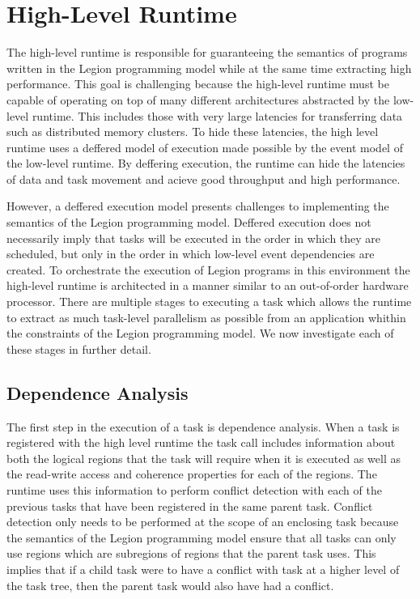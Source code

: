 
\section{High-Level Runtime} 
\label{sec:highlevel}
The high-level runtime is responsible for guaranteeing the semantics 
of programs written in the Legion programming model while at the same
time extracting high performance.  This goal is challenging because
the high-level runtime must be capable of operating on top of many 
different architectures abstracted by the low-level runtime.  This 
includes those with very large latencies for transferring data such
as distributed memory clusters.  To hide these latencies, the high
level runtime uses a deffered model of execution made possible by the
event model of the low-level runtime.  By deffering execution, the 
runtime can hide the latencies of data and task movement and acieve
good throughput and high performance.

However, a deffered execution model presents challenges to implementing
the semantics of the Legion programming model.  Deffered execution
does not necessarily imply that tasks will be executed in the order in
which they are scheduled, but only in the order in which low-level
event dependencies are created.  To orchestrate the execution of Legion
programs in this environment the high-level runtime is architected
in a manner similar to an out-of-order hardware processor.  There are
multiple stages to executing a task which allows the runtime to extract
as much task-level parallelism as possible from an application whithin
the constraints of the Legion programming model.  We now investigate
each of these stages in further detail.

\subsection{Dependence Analysis} 
\label{subsec:depanalysis}
The first step in the execution of a task is dependence analysis.  When
a task is registered with the high level runtime the task call includes
information about both the logical regions that the task will require
when it is executed as well as the read-write access and coherence properties
for each of the regions.  The runtime uses this information to perform
conflict detection with each of the previous tasks that have been registered
in the same parent task.  Conflict detection only needs to be performed at
the scope of an enclosing task because the semantics of the Legion programming
model ensure that all tasks can only use regions which are subregions of
regions that the parent task uses.  This implies that if a child task were
to have a conflict with task at a higher level of the task tree, then the
parent task would also have had a conflict.  

